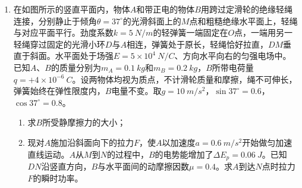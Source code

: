 \begin{enumerate}[leftmargin=0em]
\item
{}
在如图所示的竖直平面内，物体$ A $和带正电的物体$ B $用跨过定滑轮的绝缘轻绳连接，分别静止于倾角$ \theta =37 ^{\circ} $的光滑斜面上的$ M $点和粗糙绝缘水平面上，轻绳与对应平面平行。劲度系数$ k=5 \ N/m $的轻弹簧一端固定在$ O $点，一端用另一轻绳穿过固定的光滑小环$ D $与$ A $相连，弹簧处于原长，轻绳恰好拉直，$ DM $垂直于斜面。水平面处于场强$ E=5 \times 10^4 \ N/C $、方向水平向右的匀强电场中。已知$ A $、$ B $的质量分别为$ m_A=0.1 \ kg $和$ m_B=0.2 \ kg $，$ B $所带电荷量$ q=+4 \times 10^{-6}\ C $。设两物体均视为质点，不计滑轮质量和摩擦，绳不可伸长，弹簧始终在弹性限度内，$ B $电量不变。取$ g=10 \ m/s ^{2} $，$ \sin 37 ^{\circ} =0.6 $，$ \cos 37 ^{\circ} =0.8 $。
\begin{enumerate}
\renewcommand{\labelenumi}{\arabic{enumi}.}
\item
求$ B $所受静摩擦力的大小；
\item 
现对$ A $施加沿斜面向下的拉力$ F $，使$ A $以加速度$ a=0.6 \ m/s ^{2} $开始做匀加速直线运动。$ A $从$ M $到$ N $的过程中，$ B $的电势能增加了$ \Delta E_p=0.06\ J $。已知$ DN $沿竖直方向，$ B $与水平面间的动摩擦因数$ \mu =0.4 $。求$ A $到达$ N $点时拉力$ F $的瞬时功率。



\end{enumerate}
\begin{figure}[h!]
\flushright

\end{figure}





\end{enumerate}
